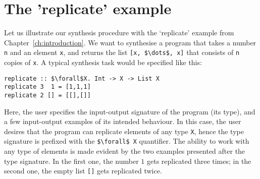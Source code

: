 


\section{The 'replicate' example}
Let us illustrate our synthesis procedure with the `replicate' example from Chapter~\ref{ch:introduction}.  We want to synthesise a program that takes a number \lstinline!n! and an element \lstinline!x!, and returns the list \lstinline![x, $\dots$, x]! that consists of \lstinline!n! copies of \lstinline!x!.  A typical synthesis task would be specified like this:
\begin{lstlisting}[style=plain]
replicate :: $\forall$X. Int -> X -> List X
replicate 3  1 = [1,1,1]
replicate 2 [] = [[],[]]
\end{lstlisting}
Here, the user specifies the input-output signature of the program (its type), and a few input-output examples of its intended behaviour.  In this case, the user desires that the program can replicate elements of any type \lstinline!X!, hence the type signature is prefixed with the \lstinline!$\forall$ X! quantifier.  The ability to work with any type of elements is made evident by the two examples presented after the type signature. In the first one, the number $1$ gets replicated three times; in the second one, the empty list \lstinline|[]| gets replicated twice.

